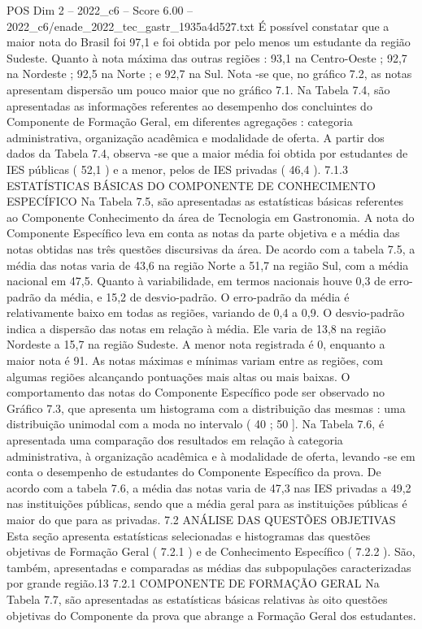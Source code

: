 \begin{textsample}{POS Dim 2 – 2022\_c6 – Score 6.00 – 2022\_c6/enade\_2022\_tec\_gastr\_1935a4d527.txt}
É possível constatar que a maior nota do Brasil foi 97,1 e foi obtida por pelo menos um estudante da região Sudeste.
Quanto à nota máxima das outras regiões : 93,1 na Centro-Oeste ; 92,7 na Nordeste ; 92,5 na Norte ; e 92,7 na Sul.
Nota -se que, no gráfico 7.2, as notas apresentam dispersão um pouco maior que no gráfico 7.1.
Na Tabela 7.4, são apresentadas as informações referentes ao desempenho dos concluintes do Componente de Formação Geral, em diferentes agregações : categoria administrativa, organização acadêmica e modalidade de oferta.
A partir dos dados da Tabela 7.4, observa -se que a maior média foi obtida por estudantes de IES públicas ( 52,1 ) e a menor, pelos de IES privadas ( 46,4 ). 7.1.3 ESTATÍSTICAS BÁSICAS DO COMPONENTE DE CONHECIMENTO ESPECÍFICO Na Tabela 7.5, são apresentadas as estatísticas básicas referentes ao Componente Conhecimento da área de Tecnologia em Gastronomia.
A nota do Componente Específico leva em conta as notas da parte objetiva e a média das notas obtidas nas três questões discursivas da área.
De acordo com a tabela 7.5, a média das notas varia de 43,6 na região Norte a 51,7 na região Sul, com a média nacional em 47,5.
Quanto à variabilidade, em termos nacionais houve 0,3 de erro-padrão da média, e 15,2 de desvio-padrão.
O erro-padrão da média é relativamente baixo em todas as regiões, variando de 0,4 a 0,9.
O desvio-padrão indica a dispersão das notas em relação à média.
Ele varia de 13,8 na região Nordeste a 15,7 na região Sudeste.
A menor nota registrada é 0, enquanto a maior nota é 91.
As notas máximas e mínimas variam entre as regiões, com algumas regiões alcançando pontuações mais altas ou mais baixas.
O comportamento das notas do Componente Específico pode ser observado no Gráfico 7.3, que apresenta um histograma com a distribuição das mesmas : uma distribuição unimodal com a moda no intervalo ( 40 ; 50 ].
Na Tabela 7.6, é apresentada uma comparação dos resultados em relação à categoria administrativa, à organização acadêmica e à modalidade de oferta, levando -se em conta o desempenho de estudantes do Componente Específico da prova.
De acordo com a tabela 7.6, a média das notas varia de 47,3 nas IES privadas a 49,2 nas instituições públicas, sendo que a média geral para as instituições públicas é maior do que para as privadas. 7.2 ANÁLISE DAS QUESTÕES OBJETIVAS Esta seção apresenta estatísticas selecionadas e histogramas das questões objetivas de Formação Geral ( 7.2.1 ) e de Conhecimento Específico ( 7.2.2 ).
São, também, apresentadas e comparadas as médias das subpopulações caracterizadas por grande região.13 7.2.1 COMPONENTE DE FORMAÇÃO GERAL Na Tabela 7.7, são apresentadas as estatísticas básicas relativas às oito questões objetivas do Componente da prova que abrange a Formação Geral dos estudantes.

\end{textsample}
